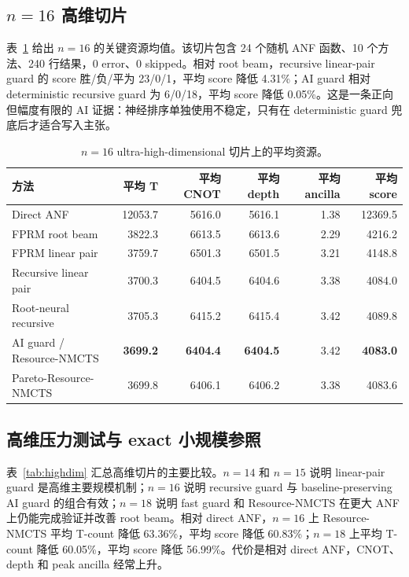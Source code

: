 \documentclass[UTF8,fontset=macnew,11pt]{ctexart}
\newcommand{\method}{Resource-NMCTS}
\newcommand{\pareto}{Pareto-Resource-NMCTS}
\begin{document}
\subsection{$n=16$ 高维切片}

表~\ref{tab:n16} 给出 $n=16$ 的关键资源均值。该切片包含 24 个随机 ANF 函数、10 个方法、240 行结果，0 error、0 skipped。相对 root beam，recursive linear-pair guard 的 score 胜/负/平为 23/0/1，平均 score 降低 4.31\%；AI guard 相对 deterministic recursive guard 为 6/0/18，平均 score 降低 0.05\%。这是一条正向但幅度有限的 AI 证据：神经排序单独使用不稳定，只有在 deterministic guard 兜底后才适合写入主张。

\begin{table}[t]
\centering
\small
\caption{$n=16$ ultra-high-dimensional 切片上的平均资源。}
\label{tab:n16}
\begin{tabular}{lrrrrr}
\toprule
方法 & 平均 T & 平均 CNOT & 平均 depth & 平均 ancilla & 平均 score \\
\midrule
Direct ANF & 12053.7 & 5616.0 & 5616.1 & 1.38 & 12369.5 \\
FPRM root beam & 3822.3 & 6613.5 & 6613.6 & 2.29 & 4216.2 \\
FPRM linear pair & 3759.7 & 6501.3 & 6501.5 & 3.21 & 4148.8 \\
Recursive linear pair & 3700.3 & 6404.5 & 6404.6 & 3.38 & 4084.0 \\
Root-neural recursive & 3705.3 & 6415.2 & 6415.4 & 3.42 & 4089.8 \\
AI guard / \method{} & \textbf{3699.2} & \textbf{6404.4} & \textbf{6404.5} & 3.42 & \textbf{4083.0} \\
\pareto{} & 3699.8 & 6406.1 & 6406.2 & 3.38 & 4083.6 \\
\bottomrule
\end{tabular}
\end{table}

\subsection{高维压力测试与 exact 小规模参照}

表~\ref{tab:highdim} 汇总高维切片的主要比较。$n=14$ 和 $n=15$ 说明 linear-pair guard 是高维主要规模机制；$n=16$ 说明 recursive guard 与 baseline-preserving AI guard 的组合有效；$n=18$ 说明 fast guard 和 \method{} 在更大 ANF 上仍能完成验证并改善 root beam。相对 direct ANF，$n=16$ 上 \method{} 平均 T-count 降低 63.36\%，平均 score 降低 60.83\%；$n=18$ 上平均 T-count 降低 60.05\%，平均 score 降低 56.99\%。代价是相对 direct ANF，CNOT、depth 和 peak ancilla 经常上升。
\end{document}
